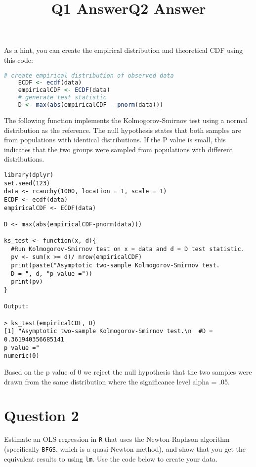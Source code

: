 \documentclass[12pt,letterpaper]{article}
\begin{document}
	
\noindent As a hint, you can create the empirical distribution and theoretical CDF using this code:

\begin{lstlisting}[language=R]
	# create empirical distribution of observed data
	ECDF <- ecdf(data)
	empiricalCDF <- ECDF(data)
	# generate test statistic
	D <- max(abs(empiricalCDF - pnorm(data))) \end{lstlisting}

\vspace{.5in}

\title{Q1 Answer}
\item The following function implements the Kolmogorov-Smirnov test
using a normal distribution as the reference. The null hypothesis states that both samples are from populations with identical distributions. If the P value is small, this indicates that the two groups were sampled from populations with different distributions.

\begin{verbatim}
library(dplyr)
set.seed(123)
data <- rcauchy(1000, location = 1, scale = 1)
ECDF <- ecdf(data)
empiricalCDF <- ECDF(data)

D <- max(abs(empiricalCDF-pnorm(data)))

ks_test <- function(x, d){
  #Run Kolmogorov-Smirnov test on x = data and d = D test statistic.
  pv <- sum(x >= d)/ nrow(empiricalCDF)
  print(paste("Asymptotic two-sample Kolmogorov-Smirnov test.
  D = ", d, "p value ="))
  print(pv)
}

Output:

> ks_test(empiricalCDF, D)
[1] "Asymptotic two-sample Kolmogorov-Smirnov test.\n  #D =  0.361940356685141 
p value ="
numeric(0)

\end{verbatim}
Based on the p value of 0 we reject the null hypothesis that the two samples were drawn from the same distribution where the significance level alpha = .05.

\vspace{.5in}
\section*{Question 2}
\noindent Estimate an OLS regression in \texttt{R} that uses the Newton-Raphson algorithm (specifically \texttt{BFGS}, which is a quasi-Newton method), and show that you get the equivalent results to using \texttt{lm}. Use the code below to create your data.
\vspace{.5cm}
 
\vspace{1in}
\title{Q2 Answer}
\end{document}
